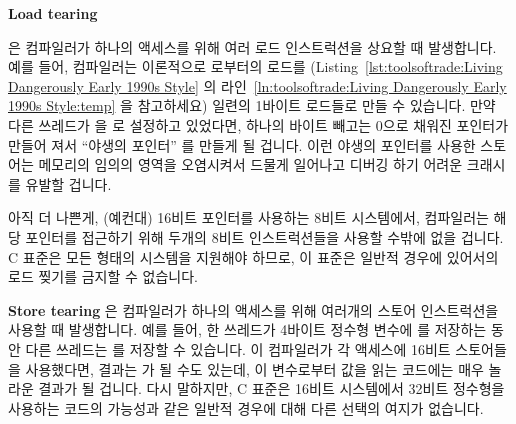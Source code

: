 {\bf Load tearing{ 은 컴파일러가 하나의 액세스를 위해 여러 로드 인스트럭션을
상요할 때 발생합니다.
예를 들어, 컴파일러는 이론적으로  로부터의 로드를
(Listing~\ref{lst:toolsoftrade:Living Dangerously Early 1990s Style} 의
라인~\ref{ln:toolsoftrade:Living Dangerously Early 1990s Style:temp} 을
참고하세요) 일련의 1바이트 로드들로 만들 수 있습니다.
만약 다른 쓰레드가  을  로 설정하고 있었다면, 하나의
바이트 빼고는 0으로 채워진 포인터가 만들어 져서 ``야생의 포인터'' 를 만들게 될
겁니다.
이런 야생의 포인터를 사용한 스토어는 메모리의 임의의 영역을 오염시켜서 드물게
일어나고 디버깅 하기 어려운 크래시를 유발할 겁니다.

아직 더 나쁜게, (예컨대) 16비트 포인터를 사용하는 8비트 시스템에서, 컴파일러는
해당 포인터를 접근하기 위해 두개의 8비트 인스트럭션들을 사용할 수밖에 없을
겁니다.
C 표준은 모든 형태의 시스템을 지원해야 하므로, 이 표준은 일반적 경우에 있어서의
로드 찢기를 금지할 수 없습니다.

{\bf Store tearing} 은 컴파일러가 하나의 액세스를 위해 여러개의 스토어
인스트럭션을 사용할 때 발생합니다.
예를 들어, 한 쓰레드가 4바이트 정수형 변수에  를 저장하는 동안 다른
쓰레드는  를 저장할 수 있습니다.
이 컴파일러가 각 액세스에 16비트 스토어들을 사용했다면, 결과는  가
될 수도 있는데, 이 변수로부터 값을 읽는 코드에는 매우 놀라운 결과가 될 겁니다.
다시 말하지만, C 표준은 16비트 시스템에서 32비트 정수형을 사용하는 코드의
가능성과 같은 일반적 경우에 대해 다른 선택의 여지가 없습니다.
\iffalse

}}
